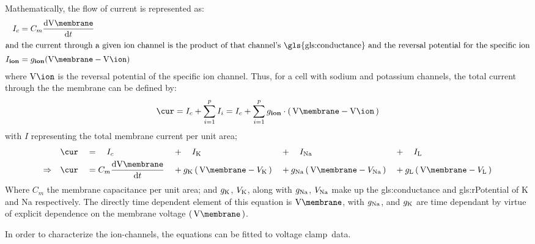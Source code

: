 \documentclass[../../Orator.tex]{subfiles}
\begin{document}
Mathematically, the flow of current is represented as:
    \begin{align}
        I_c &= C_m \ode{\unit{\V\membrane}}{t} \\
        \intertext{and the current through a given ion channel is the product of that channel's \gls{gls:conductance} and the reversal potential for the specific ion}
        I_\bfm{ion} &= {g_\bfm{ion}}(\unit{\V\membrane}-\unit{\V\ion})  
    \end{align}
where \(\unit{\V\ion}\) is the reversal potential of the specific ion channel. Thus, for a cell with sodium and potassium channels, the total current through the the membrane can be defined by:
\begin{equation}
     \unit{\cur}  =  I_c + \sum_{i = 1}^{p} I_i =  I_c + \sum_{i = 1}^{p} g_\bfm{ion} \cdot \br{\unit{\V\membrane}-\unit{\V\ion}} 
\end{equation} 
with \(I\) representing the total membrane current per unit area; 
\begin{alignat}{5}
    &\quad \unit{\cur} &&= \quad I_c \quad&&+ \quad I_\rmm{K} \quad&&+ \quad I_\rmm{Na} \quad&&+ \quad I_\rmm{L} \\ 
    \implies &\quad \unit{\cur} &&= C_m \ode{\unit{\V\membrane}}{t} &&+ {g}_\rmm{K}\br{\unit{\V\membrane} - V_\rmm{K}} &&+ {g}_\rmm{Na} \br{\unit{\V\membrane} - V_\rmm{Na}}  &&+ {g}_\rmm{L} \br{\unit{\V\membrane} - V_\rmm{L}} 
\end{alignat}
Where \(C_m\) the membrane capacitance per unit area; and \({g}_{\mathrm{K}}\), \(V_{\mathrm{K}}\), along with  \({g}_{\mathrm{Na}}\), \(V_{\mathrm{Na}}\) make up the \gls{gls:conductance} and \gls{gls:rPotential} of \gls{K} and \gls{Na} respectively.
The directly time dependent element of this equation is \(\unit{\V\membrane}\), with \({g}_{\mathrm{Na}}\), and \({g}_{\mathrm{K}}\) are time dependant by virtue of explicit dependence on the membrane voltage \(\br{\unit{\V\membrane}}\). 


In order to characterize the ion-channels, the equations can be fitted to voltage clamp\footnotemark~data.

\end{document}
